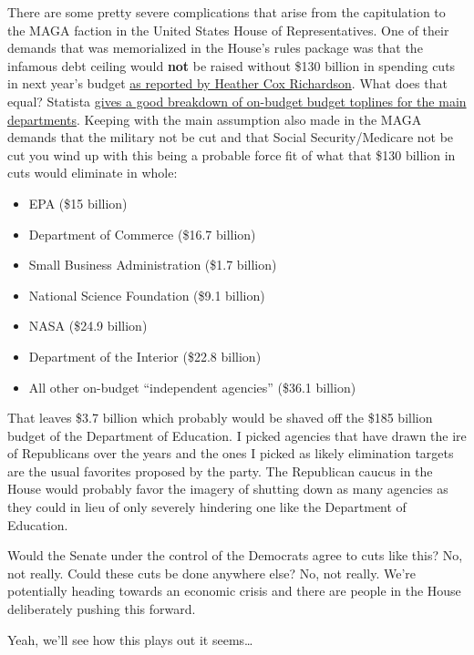 There are some pretty severe complications that arise from the
capitulation to the MAGA faction in the United States House of
Representatives. One of their demands that was memorialized in the
House's rules package was that the infamous debt ceiling would
\textbf{not} be raised without \$130 billion in spending cuts in next
year's budget
\href{https://open.substack.com/pub/heathercoxrichardson/p/january-17-2023?r=2k3po&utm_campaign=post&utm_medium=email}{as
reported by Heather Cox Richardson}. What does that equal? Statista
\href{https://www.statista.com/statistics/200386/budget-of-the-us-government-for-fiscal-year-2012-by-agencies/}{gives
a good breakdown of on-budget budget toplines for the main departments}.
Keeping with the main assumption also made in the MAGA demands that the
military not be cut and that Social Security/Medicare not be cut you
wind up with this being a probable force fit of what that \$130 billion
in cuts would eliminate in whole:

\begin{itemize}
\tightlist
\item
  EPA (\$15 billion)
\item
  Department of Commerce (\$16.7 billion)
\item
  Small Business Administration (\$1.7 billion)
\item
  National Science Foundation (\$9.1 billion)
\item
  NASA (\$24.9 billion)
\item
  Department of the Interior (\$22.8 billion)
\item
  All other on-budget ``independent agencies'' (\$36.1 billion)
\end{itemize}

That leaves \$3.7 billion which probably would be shaved off the \$185
billion budget of the Department of Education. I picked agencies that
have drawn the ire of Republicans over the years and the ones I picked
as likely elimination targets are the usual favorites proposed by the
party. The Republican caucus in the House would probably favor the
imagery of shutting down as many agencies as they could in lieu of only
severely hindering one like the Department of Education.

Would the Senate under the control of the Democrats agree to cuts like
this? No, not really. Could these cuts be done anywhere else? No, not
really. We're potentially heading towards an economic crisis and there
are people in the House deliberately pushing this forward.

Yeah, we'll see how this plays out it seems\ldots{}
